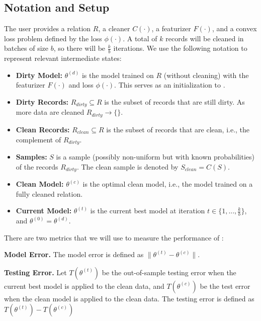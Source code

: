 \subsection{Notation and Setup}
The user provides a relation $R$, a cleaner $C(\cdot)$, a featurizer $F(\cdot)$, and a convex loss problem defined by the loss $\phi(\cdot)$.
A total of $k$ records will be cleaned in batches of size $b$, so there will be $\frac{k}{b}$ iterations. 
We use the following notation to represent relevant intermediate states:
\begin{itemize}[noitemsep]
\item \textbf{Dirty Model: } $\theta^{(d)}$ is the model trained on $R$ (without cleaning) with the featurizer $F(\cdot)$ and loss $\phi(\cdot)$. This serves as an initialization to \sys.
\item \textbf{Dirty Records: } $R_{dirty} \subseteq R$ is the subset of records that are still dirty. As more data are cleaned $R_{dirty} \rightarrow \{\}$.
\item \textbf{Clean Records: } $R_{clean} \subseteq R$ is the subset of records that are clean, i.e., the complement of $R_{dirty}$.
\item \textbf{Samples: } $S$ is a sample (possibly non-uniform but with known probabilities) of the records $R_{dirty}$. The clean sample is denoted by $S_{clean} = C(S)$.
\item \textbf{Clean Model: } $\theta^{(c)}$ is the optimal clean model, i.e., the model trained on a fully cleaned relation.
\item \textbf{Current Model: } $\theta^{(t)}$ is the current best model at iteration $t \in \{1,...,\frac{k}{b}\}$, and $\theta^{(0)} = \theta^{(d)}$. 
\end{itemize}

There are two metrics that we will use to measure the performance of \sys:

\vspace{0.25em}

\noindent\textbf{Model Error. } The model error is defined as $\|\theta^{(t)} - \theta^{(c)}\|$.

\vspace{0.25em}

\noindent\textbf{Testing Error. } Let $T(\theta^{(t)})$ be the out-of-sample testing error when the current best model is applied to the clean data, and $T(\theta^{(c)})$ be the test error when the clean model is applied to the clean data. The testing error is defined as $T(\theta^{(t)}) - T(\theta^{(c)})$

